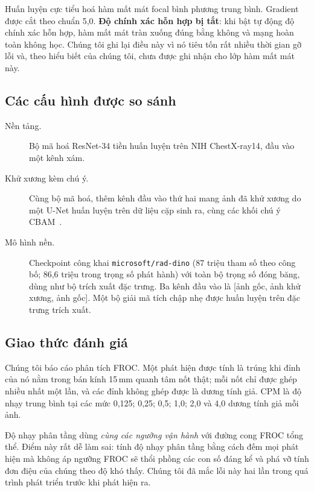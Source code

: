 \documentclass[12pt,a4paper]{article}
\begin{document}
Huấn luyện cực tiểu hoá hàm mất mát focal bình phương trung bình. Gradient được
cắt theo chuẩn 5,0. \textbf{Độ chính xác hỗn hợp bị tắt}: khi bật tự động độ
chính xác hỗn hợp, hàm mất mát tràn xuống đúng bằng không và mạng hoàn toàn không
học. Chúng tôi ghi lại điều này vì nó tiêu tốn rất nhiều thời gian gỡ lỗi và, theo
hiểu biết của chúng tôi, chưa được ghi nhận cho lớp hàm mất mát này.

\subsection{Các cấu hình được so sánh}

\begin{description}
  \item[Nền tảng.] Bộ mã hoá ResNet-34 tiền huấn luyện trên NIH ChestX-ray14,
        đầu vào một kênh xám.
  \item[Khử xương kèm chú ý.] Cùng bộ mã hoá, thêm kênh đầu vào thứ hai mang ảnh
        đã khử xương do một U-Net huấn luyện trên dữ liệu cặp sinh ra, cùng các
        khối chú ý CBAM~\cite{woo2018cbam}.
  \item[Mô hình nền.] Checkpoint công khai \texttt{microsoft/rad-dino} (87 triệu
        tham số theo công bố; 86,6 triệu trong trọng số phát hành) với toàn bộ
        trọng số đóng băng, dùng như bộ trích xuất đặc trưng. Ba kênh đầu vào là
        [ảnh gốc, ảnh khử xương, ảnh gốc]. Một bộ giải mã tích chập nhẹ được
        huấn luyện trên đặc trưng trích xuất.
\end{description}

\subsection{Giao thức đánh giá}

Chúng tôi báo cáo phân tích FROC. Một phát hiện được tính là trúng khi đỉnh của
nó nằm trong bán kính 15\,mm quanh tâm nốt thật; mỗi nốt chỉ được ghép nhiều nhất
một lần, và các đỉnh không ghép được là dương tính giả. CPM là độ nhạy trung bình
tại các mức 0,125; 0,25; 0,5; 1,0; 2,0 và 4,0 dương tính giả mỗi ảnh.

Độ nhạy phân tầng dùng \emph{cùng các ngưỡng vận hành} với đường cong FROC tổng
thể. Điểm này rất dễ làm sai: tính độ nhạy phân tầng bằng cách đếm mọi phát hiện
mà không áp ngưỡng FROC sẽ thổi phồng các con số đáng kể và phá vỡ tính đơn điệu
của chúng theo độ khó thấy. Chúng tôi đã mắc lỗi này hai lần trong quá trình phát
triển trước khi phát hiện ra.
\end{document}
